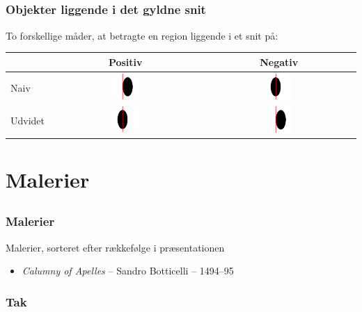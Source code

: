 \documentclass[xcolor=table]{beamer}
\begin{document}
\subsection*{}
\begin{frame}

    \frametitle{Objekter liggende i det gyldne snit}

    To forskellige måder, at betragte en region liggende i et snit på:

    \begin{center}
        \begin{tabular}{l|cc}
            & Positiv & Negativ\\\hline
            Naiv    & \includegraphics[width=0.18\textwidth]{pnaiv_nudvidet} & \includegraphics[width=0.18\textwidth]{pudvidet_nnaiv}\\
            Udvidet & \includegraphics[width=0.18\textwidth]{pudvidet_nnaiv} & \includegraphics[width=0.18\textwidth]{pnaiv_nudvidet}
        \end{tabular}
    \end{center}

\end{frame}

\section{Malerier}
\subsection*{}
\begin{frame}

    \frametitle{Malerier}

    Malerier, sorteret efter rækkefølge i præsentationen

    \begin{itemize}
        \item \emph{Calumny of Apelles} -- Sandro Botticelli -- 1494--95
    \end{itemize}


\end{frame}

\begin{frame}

    \frametitle{Tak}

\end{frame}
\end{document}
